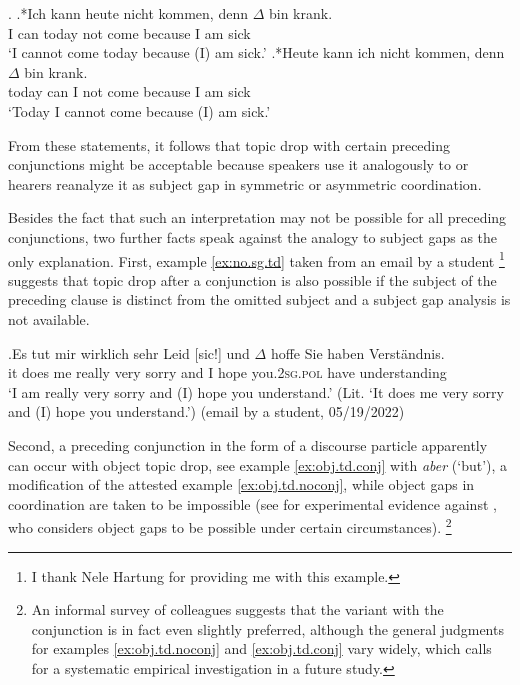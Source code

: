  \ex.
\ag.*\label{ex:denn.imp.sym}Ich kann heute nicht kommen, denn $\Delta$ bin krank.\\
 I can today not come because I am sick\\
 `I cannot come today because (I) am sick.'
\bg.*\label{ex:denn.imp.asym}Heute kann ich nicht kommen, denn $\Delta$ bin krank.\\
 today can I not come because I am sick\\
 `Today I cannot come because (I) am sick.' \citep[508, adapted]{vandevelde1986}

From these statements, it follows that topic drop with certain preceding conjunctions  might be acceptable because speakers use it analogously to or hearers reanalyze it as subject gap  in symmetric or asymmetric coordination.

Besides the fact that such an interpretation may not be possible for all preceding conjunctions,  two further facts speak against the analogy to subject gaps  as the only explanation.
First, example \ref{ex:no.sg.td} taken from an email by a student%
\footnote{I thank Nele Hartung for providing me with this example.}
%
 suggests that topic drop after a conjunction  is also possible if the subject of the preceding clause is distinct from the omitted subject and a subject gap  analysis is not available.

\exg.\label{ex:no.sg.td}Es tut mir wirklich sehr Leid [sic!] und $\Delta$ hoffe Sie haben Verständnis.\\
it does me really very sorry {} and I hope you.\textsc{2sg.pol} have understanding\\
`I am really very sorry and (I) hope you understand.' (Lit. `It does me very sorry and (I) hope you understand.') (email by a student, 05/19/2022)

Second, a preceding conjunction  in the form of a discourse particle apparently can occur with object topic drop, see example \ref{ex:obj.td.conj} with \textit{aber} (`but'), a modification of the attested example \ref{ex:obj.td.noconj}, while object gaps in coordination are taken to be impossible (see \cite{horch2014} for experimental evidence against \cite{fortmann2005}, who considers object gaps to be possible under certain circumstances).%
\footnote{An informal survey of colleagues suggests that the variant with the conjunction  is in fact even slightly preferred, although the general judgments for examples \ref{ex:obj.td.noconj} and \ref{ex:obj.td.conj} vary widely, which calls for a systematic empirical investigation in a future study.}
%

